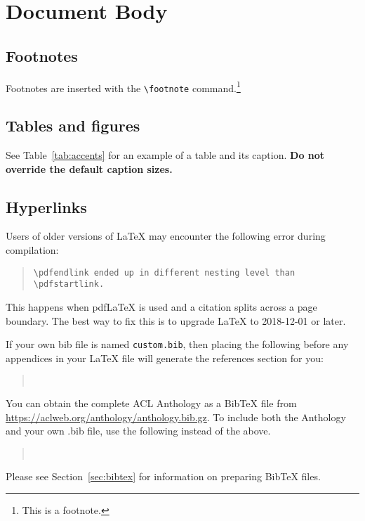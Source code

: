 \documentclass[11pt]{article}
\begin{document}
\section{Document Body}


\subsection{Footnotes}

Footnotes are inserted with the \verb|\footnote| command.\footnote{This is a footnote.}

\subsection{Tables and figures}

See Table~\ref{tab:accents} for an example of a table and its caption.
\textbf{Do not override the default caption sizes.}

\subsection{Hyperlinks}

Users of older versions of \LaTeX{} may encounter the following error during compilation:
\begin{quote}
	\tt\verb|\pdfendlink| ended up in different nesting level than \verb|\pdfstartlink|.
\end{quote}
This happens when pdf\LaTeX{} is used and a citation splits across a page boundary. The best way to fix this is to upgrade \LaTeX{} to 2018-12-01 or later.

If your own bib file is named \texttt{custom.bib}, then placing the following before any appendices in your \LaTeX{} file will generate the references section for you:
\begin{quote}
	\begin{verbatim}


\end{verbatim}
\end{quote}
You can obtain the complete ACL Anthology as a Bib\TeX{} file from \url{https://aclweb.org/anthology/anthology.bib.gz}.
To include both the Anthology and your own .bib file, use the following instead of the above.
\begin{quote}
	\begin{verbatim}


\end{verbatim}
\end{quote}
Please see Section~\ref{sec:bibtex} for information on preparing Bib\TeX{} files.
\end{document}
